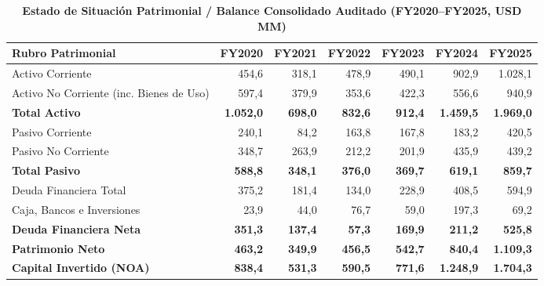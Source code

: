 \documentclass[10pt,a4paper]{article}
\begin{document}
\begin{table}[H]
\centering
\caption{\textbf{Estado de Situación Patrimonial / Balance Consolidado Auditado (FY2020--FY2025, USD MM)}}
\scriptsize
\begin{tabularx}{\textwidth}{Xrrrrrr}
\toprule
\textbf{Rubro Patrimonial} & \textbf{FY2020} & \textbf{FY2021} & \textbf{FY2022} & \textbf{FY2023} & \textbf{FY2024} & \textbf{FY2025} \\
\midrule
Activo Corriente & 454,6 & 318,1 & 478,9 & 490,1 & 902,9 & 1.028,1 \\
Activo No Corriente (inc. Bienes de Uso) & 597,4 & 379,9 & 353,6 & 422,3 & 556,6 & 940,9 \\
\textbf{Total Activo} & \textbf{1.052,0} & \textbf{698,0} & \textbf{832,6} & \textbf{912,4} & \textbf{1.459,5} & \textbf{1.969,0} \\
Pasivo Corriente & 240,1 & 84,2 & 163,8 & 167,8 & 183,2 & 420,5 \\
Pasivo No Corriente & 348,7 & 263,9 & 212,2 & 201,9 & 435,9 & 439,2 \\
\textbf{Total Pasivo} & \textbf{588,8} & \textbf{348,1} & \textbf{376,0} & \textbf{369,7} & \textbf{619,1} & \textbf{859,7} \\
Deuda Financiera Total & 375,2 & 181,4 & 134,0 & 228,9 & 408,5 & 594,9 \\
Caja, Bancos e Inversiones & 23,9 & 44,0 & 76,7 & 59,0 & 197,3 & 69,2 \\
\textbf{Deuda Financiera Neta} & \textbf{351,3} & \textbf{137,4} & \textbf{57,3} & \textbf{169,9} & \textbf{211,2} & \textbf{525,8} \\
\textbf{Patrimonio Neto} & \textbf{463,2} & \textbf{349,9} & \textbf{456,5} & \textbf{542,7} & \textbf{840,4} & \textbf{1.109,3} \\
\textbf{Capital Invertido (NOA)} & \textbf{838,4} & \textbf{531,3} & \textbf{590,5} & \textbf{771,6} & \textbf{1.248,9} & \textbf{1.704,3} \\
\bottomrule
\end{tabularx}
\end{table}
\end{document}
